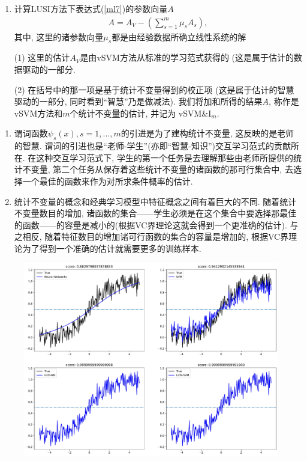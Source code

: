 \documentclass[compress,10pt,dvipsnames,notheorems]{beamer} %
\begin{document}
\begin{frame}
\begin{enumerate}
\item 计算LUSI方法下表达式(\ref{ml7})的参数向量$A$
\begin{align*}
A = A_{V} - \left( \sum_{s=1}^{m}\mu_{s}A_{s} \right),
\end{align*}
其中, 这里的诸参数向量$\mu_{s}$都是由经验数据所确立线性系统的解
\item[(1)] 这里的估计$A_{V}$是由{vSVM}方法从标准的学习范式获得的 (这是属于估计的\textsf{数据驱动的一部分}.
\item[(2)] 在括号中的那一项是基于统计不变量得到的校正项 (这是属于估计的\textsf{智慧驱动的一部分}, 同时看到“智慧”乃是做减法). 我们将加和所得的结果$A$, 称作是{vSVM}方法和$m$个统计不变量的估计, 并记为 {vSVM}\&$\text{I}_{m}$.
\end{enumerate}
\end{frame}

\begin{frame}
\begin{enumerate}
\item 谓词函数$\psi_{s}(x), s = 1,\ldots,m$的引进是为了建构统计不变量, 这反映的是老师的智慧. 谓词的引进也是“老师-学生”(亦即“智慧-知识”)交互学习范式的贡献所在. 在这种交互学习范式下, 学生的第一个任务是去理解那些由老师所提供的统计不变量, 第二个任务从保存着这些统计不变量的诸函数的那可行集合中, 去选择一个最佳的函数来作为对所求条件概率的估计.

\item 统计不变量的概念和经典学习模型中特征概念之间有着巨大的不同. 随着统计不变量数目的增加, 诸函数的集合——学生必须是在这个集合中要选择那最佳的函数——的容量是\textsf{减小的}(根据VC界理论这就会得到一个更准确的估计). 与之相反, 随着特征数目的增加诸可行函数的集合的容量是\textsf{增加的}, 根据VC界理论为了得到一个准确的估计就需要更多的训练样本.
\end{enumerate}
\end{frame}

\begin{frame}
\begin{figure}[htbp]
\includegraphics[width=1\linewidth]{Imgs/LUSI_regression_NN_SVM.pdf}
\end{figure}
\end{frame}
\end{document}
